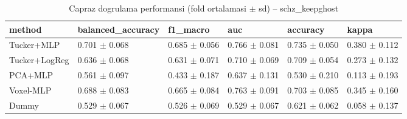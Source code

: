 \begin{table}[htbp]
  \centering
  \caption{Capraz dogrulama performansi (fold ortalamasi $\pm$ sd) -- schz\_keepghost}
  \label{tab:main_schz_keepghost}
  \small
  \begin{tabular}{llllll}
    \toprule
    method & balanced\_accuracy & f1\_macro & auc & accuracy & kappa \\
    \midrule
    Tucker+MLP & 0.701 $\pm$ 0.068 & 0.685 $\pm$ 0.056 & 0.766 $\pm$ 0.081 & 0.735 $\pm$ 0.050 & 0.380 $\pm$ 0.112 \\
    Tucker+LogReg & 0.636 $\pm$ 0.068 & 0.631 $\pm$ 0.071 & 0.710 $\pm$ 0.069 & 0.709 $\pm$ 0.054 & 0.273 $\pm$ 0.132 \\
    PCA+MLP & 0.561 $\pm$ 0.097 & 0.433 $\pm$ 0.187 & 0.637 $\pm$ 0.131 & 0.530 $\pm$ 0.210 & 0.113 $\pm$ 0.193 \\
    Voxel-MLP & 0.688 $\pm$ 0.083 & 0.665 $\pm$ 0.084 & 0.763 $\pm$ 0.091 & 0.703 $\pm$ 0.085 & 0.345 $\pm$ 0.160 \\
    Dummy & 0.529 $\pm$ 0.067 & 0.526 $\pm$ 0.069 & 0.529 $\pm$ 0.067 & 0.621 $\pm$ 0.062 & 0.058 $\pm$ 0.137 \\
    \bottomrule
  \end{tabular}
\end{table}
